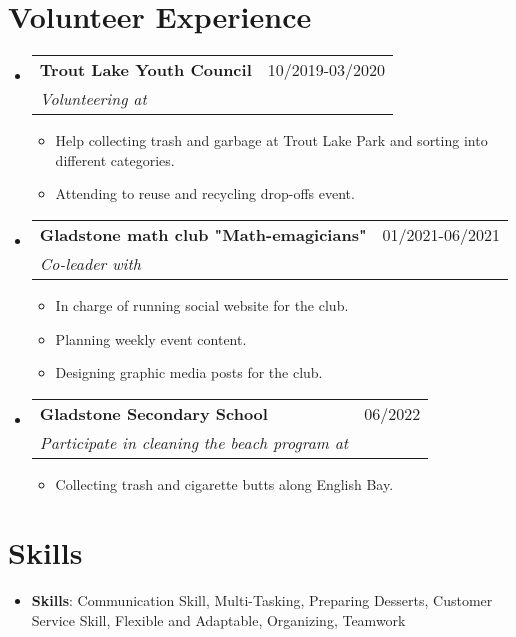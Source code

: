 \documentclass[letterpaper,11pt]{article}
\makeatletter
\newcommand{\resumeItem}[1]{
\item\small{
{#1 \vspace{-2pt}}
}
}
\newcommand{\resumeSubheading}[4]{
\vspace{-2pt}\item
\begin{tabular*}{0.97\textwidth}[t]{l@{\extracolsep{\fill}}r}
\textbf{#1} & #2 \\
\textit{\small#3} & \textit{\small #4} \\
\end{tabular*}\vspace{-7pt}
}
\newcommand{\resumeSubHeadingListStart}{\begin{itemize}[leftmargin=0.15in, label={}]}
\newcommand{\resumeSubHeadingListEnd}{\end{itemize}}
\newcommand{\resumeItemListStart}{\begin{itemize}}
\newcommand{\resumeItemListEnd}{\end{itemize}\vspace{-5pt}}
\makeatother
\begin{document}
\section{Volunteer Experience}
\resumeSubHeadingListStart
\resumeSubheading{Trout Lake Youth Council}{10/2019-03/2020}{Volunteering at}{}
\resumeItemListStart
\resumeItem{Help collecting trash and garbage at Trout Lake Park and sorting into different categories.}
\resumeItem{Attending to reuse and recycling drop-offs event.}
\resumeItemListEnd
\resumeSubheading{Gladstone math club "Math-emagicians"}{01/2021-06/2021}{Co-leader with}{}
\resumeItemListStart
\resumeItem{In charge of running social website for the club.}
\resumeItem{Planning weekly event content.}
\resumeItem{Designing graphic media posts for the club.}
\resumeItemListEnd
\resumeSubheading{Gladstone Secondary School}{06/2022}{Participate in cleaning the beach program at}{}
\resumeItemListStart
\resumeItem{Collecting trash and cigarette butts along English Bay.}
\resumeItemListEnd
\resumeSubHeadingListEnd

\section{Skills} %
\begin{itemize}[leftmargin=0.15in, label={}]
\item{
\textbf{Skills}{: Communication Skill, Multi-Tasking, Preparing Desserts, Customer Service Skill, Flexible and Adaptable, Organizing, Teamwork}
} \\
\end{itemize}


\end{document}

